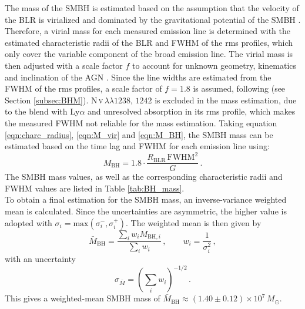 The mass of the SMBH is estimated based on the assumption that the velocity of the BLR is virialized and dominated by the gravitational potential of the SMBH \parencite{peterson2004}. Therefore, a virial mass for each measured emission line is determined with the estimated characteristic radii of the BLR and FWHM of the rms profiles, which only cover the variable component of the broad emission line. The virial mass is then adjusted with a scale factor $f$ to account for unknown geometry, kinematics and inclination of the AGN \parencite{peterson2004}. Since the line widths are estimated from the FWHM of the rms profiles, a scale factor of $f=1.8$ is assumed, following \cite{probst2025emissionlinecontinuumreverberationmapping} (see Section \ref{subsec:BHM}). N\,\textsc{v}$\,\lambda\lambda 1238,\,1242$ is excluded in the mass estimation, due to the blend with Ly$\alpha$ and unresolved absorption in its rms profile, which makes the measured FWHM not reliable for the mass estimation. Taking equation \ref{eqn:charc_radius}, \ref{eqn:M_vir} and \ref{eqn:M_BH}, the SMBH mass can be estimated based on the time lag and FWHM for each emission line using: 
\begin{equation}
	\label{eqn:BHM}
	M_{\mathrm{BH}} = 1.8 \cdot \frac{R_{\mathrm{BLR}} \,\mathrm{FWHM}^2}{G}\,.
\end{equation}
The SMBH mass values, as well as the corresponding characteristic radii and FWHM values are listed in Table \ref{tab:BH_mass}.\\
To obtain a final estimation for the SMBH mass, an inverse-variance weighted mean is calculated. Since the uncertainties are asymmetric, the higher value is adopted with $\sigma_i=\mathrm{max}(\sigma_i^-,\sigma_i^+)$.
The weighted mean is then given by
\begin{equation}
	\bar{M}_{\mathrm{BH}}=\frac{\sum_i w_i M_{\mathrm{BH},i}}{\sum_i w_i}\,,\qquad
	w_i=\frac{1}{\sigma_i^2}\,,
\end{equation}
with an uncertainty
\begin{equation}
	\sigma_{\bar{M}}=\left(\sum_i w_i\right)^{-1/2}\,.
\end{equation}
This gives a weighted-mean SMBH mass of $\bar{M}_{\mathrm{BH}}\approx (1.40 \pm 0.12)\times 10^{7}\,M_\odot$.\\

